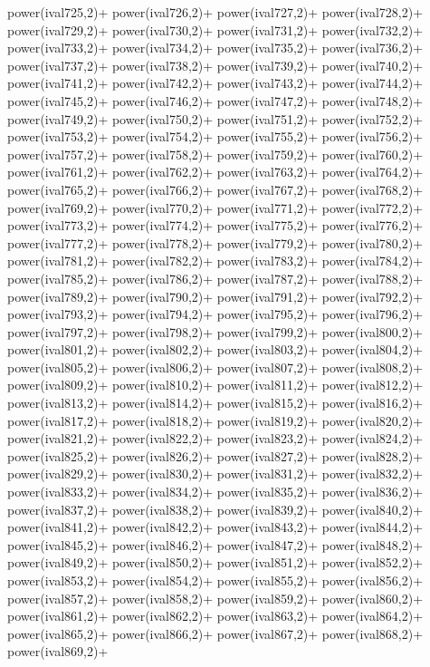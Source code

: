 \begin{DoxyCode}
{power(ival725,2)+
power(ival726,2)+
power(ival727,2)+
power(ival728,2)+
power(ival729,2)+
power(ival730,2)+
power(ival731,2)+
power(ival732,2)+
power(ival733,2)+
power(ival734,2)+
power(ival735,2)+
power(ival736,2)+
power(ival737,2)+
power(ival738,2)+
power(ival739,2)+
power(ival740,2)+
power(ival741,2)+
power(ival742,2)+
power(ival743,2)+
power(ival744,2)+
power(ival745,2)+
power(ival746,2)+
power(ival747,2)+
power(ival748,2)+
power(ival749,2)+
power(ival750,2)+
power(ival751,2)+
power(ival752,2)+
power(ival753,2)+
power(ival754,2)+
power(ival755,2)+
power(ival756,2)+
power(ival757,2)+
power(ival758,2)+
power(ival759,2)+
power(ival760,2)+
power(ival761,2)+
power(ival762,2)+
power(ival763,2)+
power(ival764,2)+
power(ival765,2)+
power(ival766,2)+
power(ival767,2)+
power(ival768,2)+
power(ival769,2)+
power(ival770,2)+
power(ival771,2)+
power(ival772,2)+
power(ival773,2)+
power(ival774,2)+
power(ival775,2)+
power(ival776,2)+
power(ival777,2)+
power(ival778,2)+
power(ival779,2)+
power(ival780,2)+
power(ival781,2)+
power(ival782,2)+
power(ival783,2)+
power(ival784,2)+
power(ival785,2)+
power(ival786,2)+
power(ival787,2)+
power(ival788,2)+
power(ival789,2)+
power(ival790,2)+
power(ival791,2)+
power(ival792,2)+
power(ival793,2)+
power(ival794,2)+
power(ival795,2)+
power(ival796,2)+
power(ival797,2)+
power(ival798,2)+
power(ival799,2)+
power(ival800,2)+
power(ival801,2)+
power(ival802,2)+
power(ival803,2)+
power(ival804,2)+
power(ival805,2)+
power(ival806,2)+
power(ival807,2)+
power(ival808,2)+
power(ival809,2)+
power(ival810,2)+
power(ival811,2)+
power(ival812,2)+
power(ival813,2)+
power(ival814,2)+
power(ival815,2)+
power(ival816,2)+
power(ival817,2)+
power(ival818,2)+
power(ival819,2)+
power(ival820,2)+
power(ival821,2)+
power(ival822,2)+
power(ival823,2)+
power(ival824,2)+
power(ival825,2)+
power(ival826,2)+
power(ival827,2)+
power(ival828,2)+
power(ival829,2)+
power(ival830,2)+
power(ival831,2)+
power(ival832,2)+
power(ival833,2)+
power(ival834,2)+
power(ival835,2)+
power(ival836,2)+
power(ival837,2)+
power(ival838,2)+
power(ival839,2)+
power(ival840,2)+
power(ival841,2)+
power(ival842,2)+
power(ival843,2)+
power(ival844,2)+
power(ival845,2)+
power(ival846,2)+
power(ival847,2)+
power(ival848,2)+
power(ival849,2)+
power(ival850,2)+
power(ival851,2)+
power(ival852,2)+
power(ival853,2)+
power(ival854,2)+
power(ival855,2)+
power(ival856,2)+
power(ival857,2)+
power(ival858,2)+
power(ival859,2)+
power(ival860,2)+
power(ival861,2)+
power(ival862,2)+
power(ival863,2)+
power(ival864,2)+
power(ival865,2)+
power(ival866,2)+
power(ival867,2)+
power(ival868,2)+
power(ival869,2)+
}
\end{DoxyCode}
